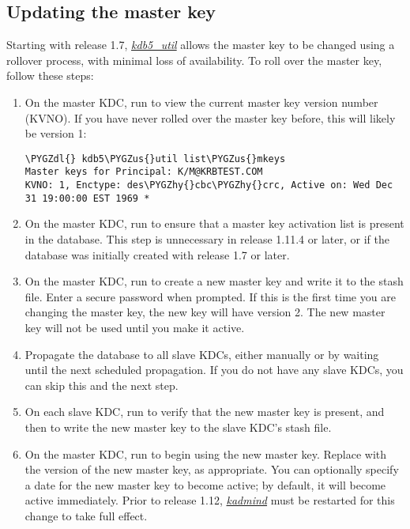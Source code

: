 \documentclass[letterpaper,10pt,english]{sphinxmanual}
\def\PYGZus{\char`\_}
\def\PYGZdl{\char`\$}
\def\PYGZhy{\char`\-}
\begin{document}
\subsection{Updating the master key}
\label{admin/database:updating-the-master-key}
Starting with release 1.7, {\hyperref[admin/admin_commands/kdb5_util:kdb5-util-8]{\emph{kdb5\_util}}} allows the master key
to be changed using a rollover process, with minimal loss of
availability.  To roll over the master key, follow these steps:
\begin{enumerate}
\item {} 
On the master KDC, run  to view the current
master key version number (KVNO).  If you have never rolled over
the master key before, this will likely be version 1:

\begin{Verbatim}[commandchars=\\\{\}]
\PYGZdl{} kdb5\PYGZus{}util list\PYGZus{}mkeys
Master keys for Principal: K/M@KRBTEST.COM
KVNO: 1, Enctype: des\PYGZhy{}cbc\PYGZhy{}crc, Active on: Wed Dec 31 19:00:00 EST 1969 *
\end{Verbatim}

\item {} 
On the master KDC, run  to ensure that a
master key activation list is present in the database.  This step
is unnecessary in release 1.11.4 or later, or if the database was
initially created with release 1.7 or later.

\item {} 
On the master KDC, run  to create a new
master key and write it to the stash file.  Enter a secure password
when prompted.  If this is the first time you are changing the
master key, the new key will have version 2.  The new master key
will not be used until you make it active.

\item {} 
Propagate the database to all slave KDCs, either manually or by
waiting until the next scheduled propagation.  If you do not have
any slave KDCs, you can skip this and the next step.

\item {} 
On each slave KDC, run  to verify that the
new master key is present, and then  to write
the new master key to the slave KDC's stash file.

\item {} 
On the master KDC, run  to begin using the
new master key.  Replace  with the version of the new master
key, as appropriate.  You can optionally specify a date for the new
master key to become active; by default, it will become active
immediately.  Prior to release 1.12, {\hyperref[admin/admin_commands/kadmind:kadmind-8]{\emph{kadmind}}} must be
restarted for this change to take full effect.


\end{enumerate}
\end{document}
